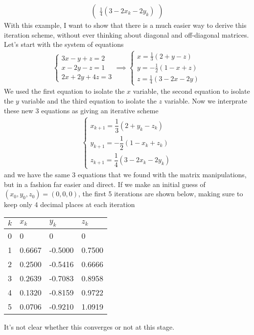 {\begin{align*}
\begin{pmatrix}
\frac{1}{4}\left(3 - 2x_{k} - 2y_{k} \right)
\end{pmatrix}
\end{align*}
With this example, I want to show that there is a much easier way to derive this iteration scheme, without ever thinking about diagonal and off-diagonal matrices. Let's start with the system of equations
\begin{align*}
\begin{cases}
3x - y + z = 2 \\
x - 2y - z = 1 \\
2x + 2y + 4z = 3
\end{cases}
\implies
\begin{cases}
x= \frac{1}{3}\left(2 + y - z \right) \\
y = -\frac{1}{2}\left(1 - x + z \right)\\
z = \frac{1}{4}\left(3 - 2x - 2y \right)
\end{cases}
\end{align*}
We used the first equation to isolate the $x$ variable, the second equation to isolate the $y$ variable and the third equation to isolate the $z$ variable. Now we interprate these new 3 equations as giving an iterative scheme
\begin{align*}
\begin{cases}
x_{k+1}= \dfrac{1}{3}\left(2 + y_k - z_k \right) \\
y_{k+1} = -\dfrac{1}{2}\left(1 - x_k + z_k \right)\\
z_{k+1} = \dfrac{1}{4}\left(3 - 2x_k - 2y_k \right)
\end{cases}
\end{align*}
and we have the same 3 equations that we found with the matrix manipulations, but in a fashion far easier and direct. If we make an initial guess of $(x_0,y_0,z_0)=(0,0,0)$, the first 5 iterations are shown below, making sure to keep only 4 decimal places at each iteration
\begin{table}[H]
\begin{center}
\begin{tabular}{l||l|l|l}
$k$ & $x_k$ & $y_k$ & $z_k$ \\ \hline
0 & 0      &       0 &      0 \\
1 & 0.6667 & -0.5000 & 0.7500 \\
2 & 0.2500 & -0.5416 & 0.6666 \\
3 & 0.2639 & -0.7083 & 0.8958 \\
4 & 0.1320 & -0.8159 & 0.9722 \\
5 & 0.0706 & -0.9210 & 1.0919 
\end{tabular}
\end{center}
\end{table}
It's not clear whether this converges or not at this stage.
}{\downline}


